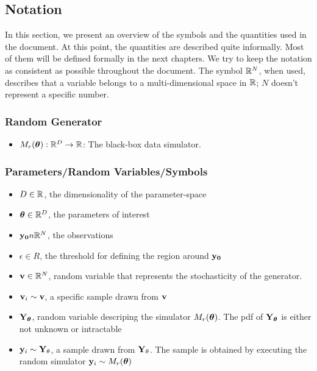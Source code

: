 \subsection{Notation}
\label{subsec:notation}

In this section, we present an overview of the symbols and the
quantities used in the document. At this point, the quantities are
described quite informally. Most of them will be defined formally in
the next chapters. We try to keep the notation as consistent as
possible throughout the document. The symbol $\mathbb{R}^N$, when used, describes 
that a variable belongs to a multi-dimensional space in $\mathbb{R}$; $N$
doesn't represent a specific number.

\subsubsection*{Random Generator}
\label{sec:random-generator}
\begin{itemize}
\item $M_r(\boldsymbol{\theta}): \mathbb{R}^D \rightarrow \mathbb{R}$: The black-box data simulator.
\end{itemize}

\subsubsection*{Parameters/Random Variables/Symbols}
\label{sec:variables}

\begin{itemize}
\item $D \in \mathbb{R}$, the dimensionality of the parameter-space
\item $\boldsymbol{\theta} \in \mathbb{R}^D$, the parameters of interest
\item $\mathbf{y_0} n\mathbb{R}^N$, the observations
\item $\epsilon \in R$, the threshold for defining the region around $\mathbf{y_0}$
\item $\mathbf{v} \in \mathbb{R}^N$, random variable that represents the stochasticity of
  the generator.
\item $\mathbf{v}_i \sim \mathbf{v}$, a specific sample drawn from $\mathbf{v}$
\item $\mathbf{Y}_{\boldsymbol{\theta}}$, random variable descriping the simulator
  $M_r(\boldsymbol{\theta})$. The pdf of $\mathbf{Y}_{\boldsymbol{\theta}}$ is either not unknown or intractable
\item $\mathbf{y}_i \sim \mathbf{Y}_\theta$, a sample drawn from $\mathbf{Y}_\theta$. The
  sample is obtained by executing the random simulator
  $\mathbf{y}_i \sim M_r(\boldsymbol{\theta})$
\end{itemize}


